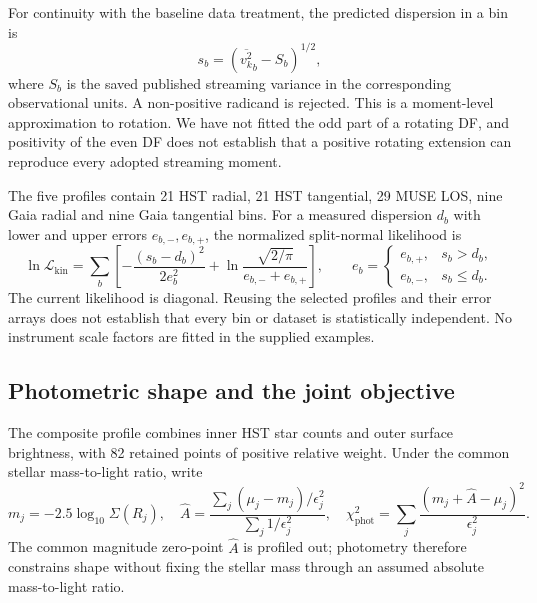 \documentclass[11pt,a4paper]{article}
\newcommand{\kin}{\mathrm{kin}}
\newcommand{\phot}{\mathrm{phot}}
\begin{document}
For continuity with the baseline data treatment, the predicted dispersion in
a bin is
\begin{equation}
 s_b=\left(\overline{v_k^2}_b-S_b\right)^{1/2},
 \label{eq:streaming}
\end{equation}
where $S_b$ is the saved published streaming variance in the corresponding
observational units. A non-positive radicand is rejected. This is a
moment-level approximation to rotation. We have not fitted the odd part of
a rotating DF, and positivity of the even DF does not establish that a
positive rotating extension can reproduce every adopted streaming moment.

The five profiles contain 21 HST radial, 21 HST tangential, 29 MUSE LOS,
nine Gaia radial and nine Gaia tangential bins. For a measured dispersion
$d_b$ with lower and upper errors $e_{b,-},e_{b,+}$, the normalized
split-normal likelihood is
\begin{equation}
 \ln\mathcal L_\kin=
 \sum_b\left[-\frac{(s_b-d_b)^2}{2e_b^2}
 +\ln\frac{\sqrt{2/\pi}}{e_{b,-}+e_{b,+}}\right],\qquad
 e_b=\begin{cases}e_{b,+},&s_b>d_b,\\e_{b,-},&s_b\leq d_b.\end{cases}
 \label{eq:likelihood}
\end{equation}
The current likelihood is diagonal. Reusing the selected profiles and their
error arrays does not establish that every bin or dataset is statistically
independent. No instrument scale factors are fitted in the supplied examples.

\subsection{Photometric shape and the joint objective}

The composite profile combines inner HST star counts and outer surface
brightness, with 82 retained points of positive relative weight. Under the
common stellar mass-to-light ratio, write
\begin{equation}
 m_j=-2.5\log_{10}\Sigma(R_j),\quad
 \widehat A=\frac{\sum_j(\mu_j-m_j)/\epsilon_j^2}
                 {\sum_j1/\epsilon_j^2},\quad
 \chi^2_\phot=\sum_j\frac{(m_j+\widehat A-\mu_j)^2}{\epsilon_j^2}.
 \label{eq:photometry}
\end{equation}
The common magnitude zero-point $\widehat A$ is profiled out; photometry
therefore constrains shape without fixing the stellar mass through an
assumed absolute mass-to-light ratio.
\end{document}
